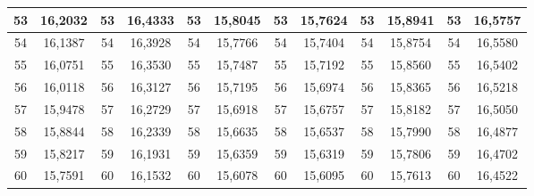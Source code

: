 \documentclass[a4paper,12pt]{article} %
\begin{document}
\begin{longtable}[c]{cccccccccc|c|c|}
	\multicolumn{1}{|c|}{53} & \multicolumn{1}{c|}{16,2032} & \multicolumn{1}{c|}{53} & \multicolumn{1}{c|}{16,4333} & \multicolumn{1}{c|}{53} & \multicolumn{1}{c|}{15,8045} & \multicolumn{1}{c|}{53} & \multicolumn{1}{c|}{15,7624} & \multicolumn{1}{c|}{53} & 15,8941 & 53 & 16,5757 \\ \hline
	\multicolumn{1}{|c|}{54} & \multicolumn{1}{c|}{16,1387} & \multicolumn{1}{c|}{54} & \multicolumn{1}{c|}{16,3928} & \multicolumn{1}{c|}{54} & \multicolumn{1}{c|}{15,7766} & \multicolumn{1}{c|}{54} & \multicolumn{1}{c|}{15,7404} & \multicolumn{1}{c|}{54} & 15,8754 & 54 & 16,5580 \\ \hline
	\multicolumn{1}{|c|}{55} & \multicolumn{1}{c|}{16,0751} & \multicolumn{1}{c|}{55} & \multicolumn{1}{c|}{16,3530} & \multicolumn{1}{c|}{55} & \multicolumn{1}{c|}{15,7487} & \multicolumn{1}{c|}{55} & \multicolumn{1}{c|}{15,7192} & \multicolumn{1}{c|}{55} & 15,8560 & 55 & 16,5402 \\ \hline
	\multicolumn{1}{|c|}{56} & \multicolumn{1}{c|}{16,0118} & \multicolumn{1}{c|}{56} & \multicolumn{1}{c|}{16,3127} & \multicolumn{1}{c|}{56} & \multicolumn{1}{c|}{15,7195} & \multicolumn{1}{c|}{56} & \multicolumn{1}{c|}{15,6974} & \multicolumn{1}{c|}{56} & 15,8365 & 56 & 16,5218 \\ \hline
	\multicolumn{1}{|c|}{57} & \multicolumn{1}{c|}{15,9478} & \multicolumn{1}{c|}{57} & \multicolumn{1}{c|}{16,2729} & \multicolumn{1}{c|}{57} & \multicolumn{1}{c|}{15,6918} & \multicolumn{1}{c|}{57} & \multicolumn{1}{c|}{15,6757} & \multicolumn{1}{c|}{57} & 15,8182 & 57 & 16,5050 \\ \hline
	\multicolumn{1}{|c|}{58} & \multicolumn{1}{c|}{15,8844} & \multicolumn{1}{c|}{58} & \multicolumn{1}{c|}{16,2339} & \multicolumn{1}{c|}{58} & \multicolumn{1}{c|}{15,6635} & \multicolumn{1}{c|}{58} & \multicolumn{1}{c|}{15,6537} & \multicolumn{1}{c|}{58} & 15,7990 & 58 & 16,4877 \\ \hline
	\multicolumn{1}{|c|}{59} & \multicolumn{1}{c|}{15,8217} & \multicolumn{1}{c|}{59} & \multicolumn{1}{c|}{16,1931} & \multicolumn{1}{c|}{59} & \multicolumn{1}{c|}{15,6359} & \multicolumn{1}{c|}{59} & \multicolumn{1}{c|}{15,6319} & \multicolumn{1}{c|}{59} & 15,7806 & 59 & 16,4702 \\ \hline
	\multicolumn{1}{|c|}{60} & \multicolumn{1}{c|}{15,7591} & \multicolumn{1}{c|}{60} & \multicolumn{1}{c|}{16,1532} & \multicolumn{1}{c|}{60} & \multicolumn{1}{c|}{15,6078} & \multicolumn{1}{c|}{60} & \multicolumn{1}{c|}{15,6095} & \multicolumn{1}{c|}{60} & 15,7613 & 60 & 16,4522 \\ \hline

\end{longtable}
\end{document}
